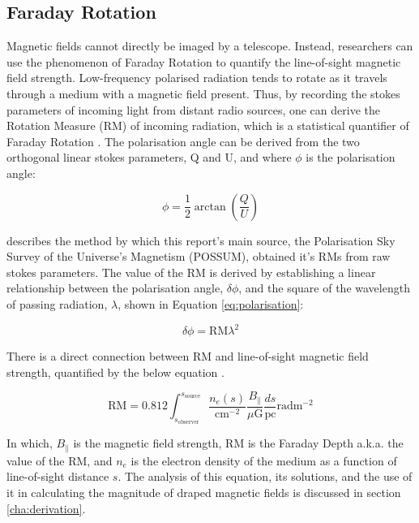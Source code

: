 \subsection{Faraday Rotation}
\label{ssec:faraday}

Magnetic fields cannot directly be imaged by a telescope. Instead, researchers can use the phenomenon of Faraday Rotation to quantify the line-of-sight magnetic field strength. Low-frequency polarised radiation tends to rotate as it travels through a medium with a magnetic field present. Thus, by recording the stokes parameters of incoming light from distant radio sources, one can derive the Rotation Measure (RM) of incoming radiation, which is a statistical quantifier of Faraday Rotation \citep{ID1, ID14}. The polarisation angle can be derived from the two orthogonal linear stokes parameters, Q and U, and where $\phi$ is the polarisation angle:

\begin{equation}
\phi = \frac{1}{2} \arctan{\left(\frac{Q}{U}\right)}
\label{eq:stokes}
\end{equation}


\cite{ID1} describes the method by which this report's main source, the Polarisation Sky Survey of the Universe's Magnetism (POSSUM), obtained it's RMs from raw stokes parameters. The value of the RM is derived by establishing a linear relationship between the polarisation angle, $\delta \phi$, and the square of the wavelength of passing radiation, $\lambda$, shown in Equation \ref{eq:polarisation}:


\begin{equation}
    \delta \phi = \mathrm{RM}\lambda^2
    \label{eq:polarisation}
\end{equation}


There is a direct connection between RM and line-of-sight magnetic field strength, quantified by the below equation \citep{ID5, ID1, ID26, ID27, ID30}.


\begin{equation}
    \mathrm{RM} = 0.812 \int_{s_{\mathrm{observer}}}^{s_{\mathrm{source}}}{\frac{n_e(s)}{\mathrm{cm^{-2}}}\frac{B_{\parallel}}{\mu\mathrm{G}}\frac{ds}{\mathrm{pc}}} \mathrm{rad m^{-2}}
    \label{eq:rm_integral}
\end{equation}


In which, $B_{\parallel}$ is the magnetic field strength, $\mathrm{RM}$ is the Faraday Depth a.k.a. the value of the RM, and $n_e$ is the electron density of the medium as a function of line-of-sight distance $s$. The analysis of this equation, its solutions, and the use of it in calculating the magnitude of draped magnetic fields is discussed in section \ref{cha:derivation}.


